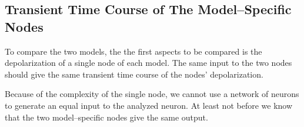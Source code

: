 	\subsection{Transient Time Course of The Model--Specific Nodes}

To compare %
			the two models, the the first aspects to be compared is the depolarization  of a single node of each model.
The same input to the two nodes should give the same transient time course of the nodes' depolarization.

Because of the complexity of the single node, we cannot use a network of neurons to generate an equal input to the analyzed neuron. 
At least not before we know that the two model--specific nodes give the same output. %

%
%
%


